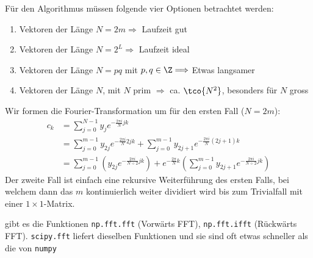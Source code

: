 Für den Algorithmus müssen folgende vier Optionen betrachtet werden:
\begin{enumerate}[label=\Roman*]
    \item Vektoren der Länge $N = 2m \Longrightarrow$ Laufzeit gut
    \item Vektoren der Länge $N = 2^L \Longrightarrow$ Laufzeit ideal
    \item Vektoren der Länge $N = pq$ mit $p, q \in \Z \Longrightarrow$ Etwas langsamer
    \item Vektoren der Länge $N$, mit $N$ prim $\Longrightarrow$ ca. $\tco{N^2}$, besonders für $N$ gross
\end{enumerate}
Wir formen die Fourier-Transformation um für den ersten Fall ($N = 2m$):
\begin{align*}
    c_k & = \sum_{j = 0}^{N - 1} y_j e^{- \frac{2\pi i}{N} jk}                                                                     \\
        & = \sum_{j = 0}^{m - 1} y_{2j} e^{-\frac{2 \pi i}{N}2jk} + \sum_{j = 0}^{m - 1} y_{2j + 1} e^{-\frac{2\pi i}{N}(2j + 1)k} \\
        & = \sum_{j = 0}^{m - 1} \left( y_{2j} e^{-\frac{2 \pi i}{N \div 2}jk} \right)
    + e^{- \frac{2\pi}{N} k} \left( \sum_{j = 0}^{m - 1} y_{2j + 1} e^{-\frac{2\pi i}{N \div 2}jk} \right)
\end{align*}
Der zweite Fall ist einfach eine rekursive Weiterführung des ersten Falls,
bei welchem dann das $m$ kontinuierlich weiter dividiert wird bis zum Trivialfall mit einer $1 \times 1$-Matrix.

 gibt es die Funktionen \texttt{np.fft.fft} (Vorwärts FFT), \texttt{np.fft.ifft} (Rückwärts FFT). 
\texttt{scipy.fft} liefert dieselben Funktionen und sie sind oft etwas schneller als die von \texttt{numpy}
